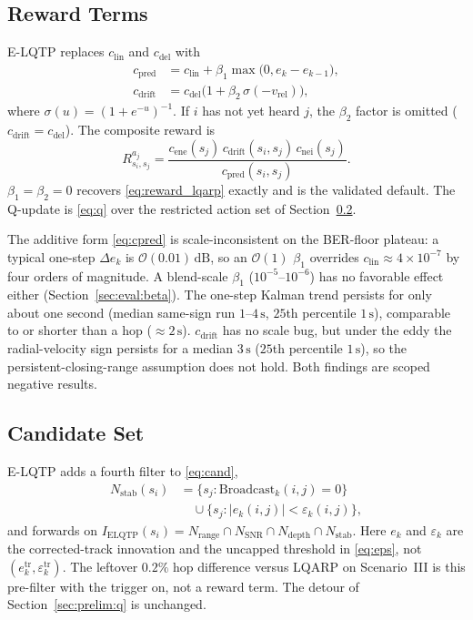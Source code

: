 \subsection{Reward Terms}
\label{sec:design:reward}
E-LQTP replaces $c_{\mathrm{lin}}$ and $c_{\mathrm{del}}$ with
\begin{align}
\label{eq:cpred}
c_{\mathrm{pred}}
&= c_{\mathrm{lin}}
+\beta_1\max\bigl(0,e_k-e_{k-1}\bigr),\\
\label{eq:cdrift}
c_{\mathrm{drift}}
&= c_{\mathrm{del}}
\bigl(1+\beta_2\,\sigma(-v_{\mathrm{rel}})\bigr),
\end{align}
where $\sigma(u)=(1+e^{-u})^{-1}$.
If $i$ has not yet heard $j$, the $\beta_2$ factor is omitted
($c_{\mathrm{drift}}=c_{\mathrm{del}}$).
The composite reward is
\begin{equation}
\label{eq:reward_elqtp}
R^{a_j}_{s_i,s_j}
= \frac{c_{\mathrm{ene}}(s_j)\,c_{\mathrm{drift}}(s_i,s_j)\,
c_{\mathrm{nei}}(s_j)}{c_{\mathrm{pred}}(s_i,s_j)}.
\end{equation}
$\beta_1=\beta_2=0$ recovers \eqref{eq:reward_lqarp} exactly and is
the validated default.
The Q-update is \eqref{eq:q} over the restricted action set of
Section~\ref{sec:design:cand}.

The additive form \eqref{eq:cpred} is scale-inconsistent on the
BER-floor plateau: a typical one-step $\Delta e_k$ is
$\mathcal{O}(0.01)\,\mathrm{dB}$, so an $\mathcal{O}(1)$ $\beta_1$
overrides $c_{\mathrm{lin}}\approx 4\times 10^{-7}$ by four orders
of magnitude.
A blend-scale $\beta_1$ ($10^{-5}$--$10^{-6}$) has no favorable
effect either (Section~\ref{sec:eval:beta}).
The one-step Kalman trend persists for only about one second
(median same-sign run $1$--$4\,\mathrm{s}$, $25$th percentile
$1\,\mathrm{s}$), comparable to or shorter than a hop
($\approx 2\,\mathrm{s}$).
$c_{\mathrm{drift}}$ has no scale bug, but under the eddy the
radial-velocity sign persists for a median $3\,\mathrm{s}$
($25$th percentile $1\,\mathrm{s}$), so the
persistent-closing-range assumption does not hold.
Both findings are scoped negative results.

\subsection{Candidate Set}
\label{sec:design:cand}
E-LQTP adds a fourth filter to \eqref{eq:cand},
\begin{equation}
\label{eq:nstab}
\begin{aligned}
N_{\mathrm{stab}}(s_i)
&=\bigl\{s_j:\mathrm{Broadcast}_k(i,j)=0\bigr\}\\
&\quad\cup
\bigl\{s_j:|e_k(i,j)|<\varepsilon_k(i,j)\bigr\},
\end{aligned}
\end{equation}
and forwards on
$I_{\mathrm{ELQTP}}(s_i)
=N_{\mathrm{range}}\cap N_{\mathrm{SNR}}\cap N_{\mathrm{depth}}
\cap N_{\mathrm{stab}}$.
Here $e_k$ and $\varepsilon_k$ are the corrected-track innovation and
the uncapped threshold in \eqref{eq:eps}, not
$(e_k^{\mathrm{tr}},\varepsilon_k^{\mathrm{tr}})$.
The leftover $0.2\%$ hop difference versus LQARP on Scenario~III
is this pre-filter with the trigger on, not a reward term.
The detour of Section~\ref{sec:prelim:q} is unchanged.

